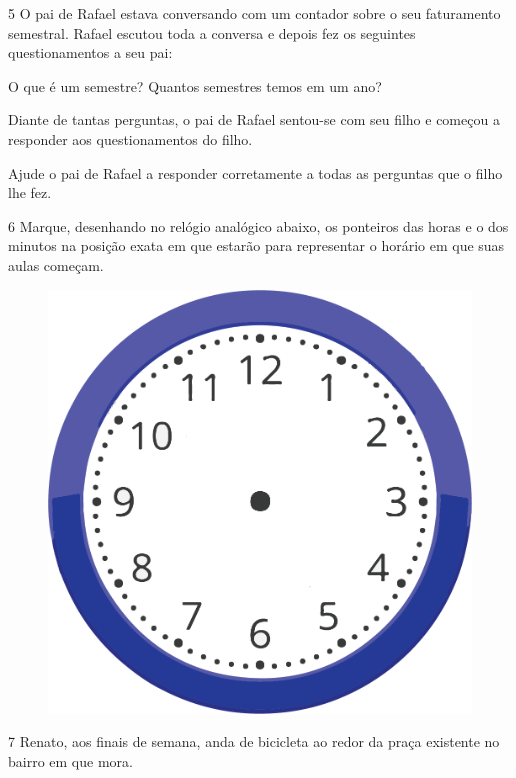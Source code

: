 \num{5} O pai de Rafael estava conversando com um contador sobre o seu
faturamento semestral. Rafael escutou toda a conversa e depois fez os
seguintes questionamentos a seu pai:

O que é um semestre? 
Quantos semestres temos em um ano?

Diante de tantas perguntas, o pai de Rafael sentou-se com seu filho e
começou a responder aos questionamentos do filho.

Ajude o pai de Rafael a responder corretamente a todas as perguntas que o filho lhe fez.

\pagebreak
\num{6} Marque, desenhando no relógio analógico abaixo, os ponteiros das horas e o dos
minutos na posição exata em que estarão para representar o horário em que
suas aulas começam.

\begin{figure}[htpb!]
\includegraphics[width=\textwidth]{./media/image54b.png}
\end{figure}


\pagebreak
\num{7} Renato, aos finais de semana, anda de bicicleta ao redor da praça existente no bairro em que mora.

